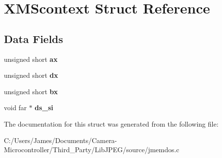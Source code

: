 \hypertarget{struct_x_m_scontext}{}\section{X\+M\+Scontext Struct Reference}
\label{struct_x_m_scontext}
\subsection*{Data Fields}
\begin{DoxyCompactItemize}
\item 
\mbox{\label{struct_x_m_scontext_aefac0f43e68315a5cac20b6cce6e3436}} 
unsigned short {\bfseries ax}
\item 
\mbox{\label{struct_x_m_scontext_a81cae824d501dd0819a121d3ac14afc7}} 
unsigned short {\bfseries dx}
\item 
\mbox{\label{struct_x_m_scontext_aa8dc7a6759f334d78f8a7d949fd48269}} 
unsigned short {\bfseries bx}
\item 
\mbox{\label{struct_x_m_scontext_a6d9c8d760489c4c62469b0281d01810a}} 
void far $\ast$ {\bfseries ds\+\_\+si}
\end{DoxyCompactItemize}


The documentation for this struct was generated from the following file\+:\begin{DoxyCompactItemize}
\item 
C\+:/\+Users/\+James/\+Documents/\+Camera-\/\+Microcontroller/\+Third\+\_\+\+Party/\+Lib\+J\+P\+E\+G/source/jmemdos.\+c\end{DoxyCompactItemize}
